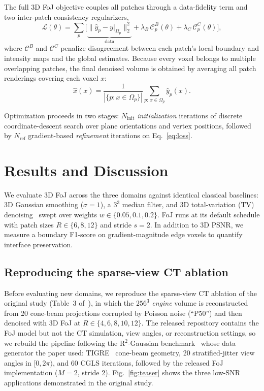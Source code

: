 \documentclass[11pt]{article}
\begin{document}
The full 3D FoJ objective couples all patches through a data-fidelity
term and two inter-patch consistency regularizers,
\begin{equation}
  \mathcal{L}(\theta)=\sum_p \Big[\underbrace{\|\hat y_p - y|_{\Omega_p}\|_2^2}_{\text{data}}
  + \lambda_B\,\mathcal{C}^{B}_p(\theta) + \lambda_C\,\mathcal{C}^{C}_p(\theta)\Big],
  \label{eq:loss}
\end{equation}
where $\mathcal{C}^B$ and $\mathcal{C}^C$ penalize disagreement between
each patch's local boundary and intensity maps and the global estimates.
Because every voxel belongs to multiple overlapping patches, the final
denoised volume is obtained by averaging all patch renderings covering
each voxel $x$:
\begin{equation}
  \hat x(x)=\frac{1}{|\{p: x\in\Omega_p\}|}\sum_{p:\,x\in\Omega_p}\hat y_p(x).
  \label{eq:avg}
\end{equation}

Optimization proceeds in two stages: $N_{\text{init}}$
\emph{initialization} iterations of discrete coordinate-descent search
over plane orientations and vertex positions, followed by $N_{\text{ref}}$
gradient-based \emph{refinement} iterations on Eq.~\eqref{eq:loss}.

\section{Results and Discussion}

We evaluate 3D FoJ across the three domains against identical classical
baselines: 3D Gaussian smoothing ($\sigma{=}1$), a $3^3$ median filter,
and 3D total-variation (TV)
denoising~\cite{rudin1992nonlinear,chambolle2004algorithm} swept over
weights $w\in\{0.05,0.1,0.2\}$. FoJ runs at its default schedule with
patch sizes $R\in\{6,8,12\}$ and stride $s{=}2$. In addition to 3D PSNR,
we measure a boundary F1-score on gradient-magnitude edge voxels to
quantify interface preservation.

\subsection{Reproducing the sparse-view CT ablation}

Before evaluating new domains, we reproduce the sparse-view CT ablation
of the original study (Table~3 of~\cite{moeini2026foj3d}), in which the
$256^3$ \emph{engine} volume is reconstructed from 20 cone-beam
projections corrupted by Poisson noise (``P50'') and then denoised with
3D FoJ at $R\in\{4,6,8,10,12\}$. The released repository contains the
FoJ model but not the CT simulation, view angles, or reconstruction
settings, so we rebuild the pipeline following the R$^2$-Gaussian
benchmark~\cite{zha2024r2gaussian} whose data generator the paper used:
TIGRE~\cite{biguri2016tigre} cone-beam geometry, 20 stratified-jitter
view angles in $[0,2\pi)$, and 60 CGLS iterations, followed by the
released FoJ implementation ($M{=}2$, stride 2).
Fig.~\ref{fig:teaser} shows the three low-SNR applications demonstrated
in the original study.
\end{document}
